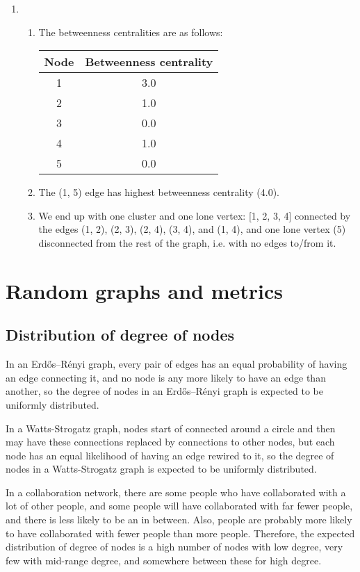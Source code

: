 \documentclass[12pt]{article}
\begin{document}
\begin{enumerate}
    \item \begin{enumerate}
        \item The betweenness centralities are as follows:\\
            \begin{tabular}{|c|c|}
                \hline
                \textbf{Node} & \textbf{Betweenness centrality}\\
                \hline
                1 & 3.0 \\
                2 & 1.0 \\
                3 & 0.0 \\
                4 & 1.0 \\
                5 & 0.0 \\
                \hline
            \end{tabular}
        \item The (1, 5) edge has highest betweenness centrality (4.0).
        \item We end up with one cluster and one lone vertex: [1, 2, 3, 4] connected by the edges (1, 2), (2, 3), (2, 4), (3, 4), and (1, 4), and one lone vertex (5) disconnected from the rest of the graph, i.e. with no edges to/from it.
    \end{enumerate}
\end{enumerate}

\section*{Random graphs and metrics}
\subsection*{Distribution of degree of nodes}
In an Erdős–Rényi graph, every pair of edges has an equal probability of having an edge connecting it, and no node is any more likely to have an edge than another, so the degree of nodes in an Erdős–Rényi graph is expected to be uniformly distributed.

In a Watts-Strogatz graph, nodes start of connected around a circle and then may have these connections replaced by connections to other nodes, but each node has an equal likelihood of having an edge rewired to it, so the degree of nodes in a Watts-Strogatz graph is expected to be uniformly distributed.

In a collaboration network, there are some people who have collaborated with a lot of other people, and some people will have collaborated with far fewer people, and there is less likely to be an in between. Also, people are probably more likely to have collaborated with fewer people than more people. Therefore, the expected distribution of degree of nodes is a high number of nodes with low degree, very few with mid-range degree, and somewhere between these for high degree.
\end{document}
